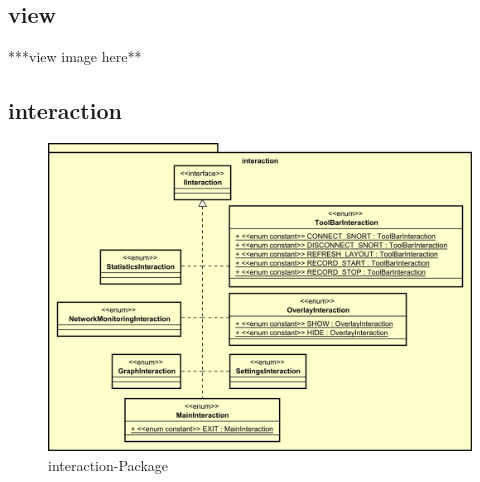 \subsection{view}
\label{subsec:view}

***view image here**

\subsection{interaction}
\label{subsec:interaction}

\begin{figure}[H]
  \centering
  \includegraphics[width=\textwidth]{../diagramimages/interaction.png}
  \caption{interaction-Package}
\end{figure}

\medskip

